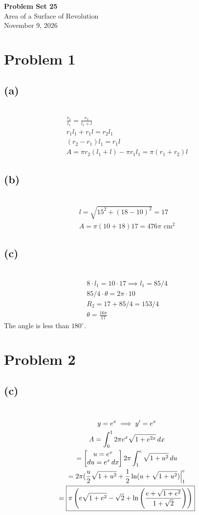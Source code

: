 \documentclass[12pt]{article}
\newcommand*{\paren}[1]{\ensuremath\left(#1\right)}
\newcommand{\at}{\Big|}
\newcommand{\problem}[1]{\section{Problem #1}}
\newcommand{\subproblem}[1]{\subsection{(#1)} \,}
\begin{document}
\vspace*{0cm}

\begin{center}
    {\Large \bfseries Problem Set 25} \\[0.5cm]
    {\large Area of a Surface of Revolution} \\[0.35cm]
    {\normalsize November 9, 2026}
\end{center}


\problem{1}

\subproblem{a}
\begin{gather*}
    \frac{r_1}{l_1}=\frac{r_2}{l_1+l}\\
    r_1 l_1 + r_1 l = r_2 l_1\\
    \boxed{(r_2-r_1)l_1=r_1l}\\
    A=\pi r_2(l_1+l)-\pi r_1l_1=\boxed{\pi (r_1+r_2)l}
\end{gather*}

\subproblem{b}
\begin{gather*}
    l=\sqrt{15^2+(18-10)^2}=17\\
    A=\pi (10+18)17=\boxed{476\pi \text{ cm}^2}
\end{gather*}

\subproblem{c}
\begin{gather*}
    8\cdot l_1=10\cdot 17\implies l_1=85/4\\
    85/4 \cdot \theta =2\pi \cdot 10\\
    R_2=17+85/4=153/4\\
    \theta =\boxed{\frac{16\pi}{17}}
\end{gather*}
The angle is less than $180^\circ$. 

\problem{2}

\subproblem{c}
\begin{gather*}
    y=e^x \implies y'=e^x\\
    A=\int_0^12\pi e^x\sqrt{1+e^{2x}} \, dx\\
    = \begin{bmatrix}
        u=e^{x}\\
        du=e^x\, dx
    \end{bmatrix} 2\pi \int_1^e \sqrt{1+u^2} \, du\\
    =2\pi (\frac{u}{2}\sqrt{1+u^2}+\frac{1}{2}\ln (u+\sqrt{1+u^2}) \at_1^e\\
    =\boxed{ \pi \paren{ e\sqrt{1+e^2} - \sqrt{ 2}+ \ln \paren{ \frac{e+\sqrt{1+e^2}}{1+\sqrt{2}}}}}
\end{gather*}
\end{document}
